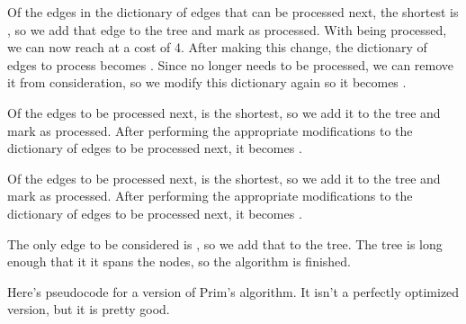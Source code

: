 Of the edges in the dictionary of edges that can be processed next, the shortest is , so we add that edge to the tree and mark  as processed.
With  being processed, we can now reach  at a cost of 4.
After making this change, the dictionary of edges to process becomes .
Since  no longer needs to be processed, we can remove it from consideration, so we modify this dictionary again so it becomes .

Of the edges to be processed next,  is the shortest, so we add it to the tree and mark  as processed.
After performing the appropriate modifications to the dictionary of edges to be processed next, it becomes .

Of the edges to be processed next,  is the shortest, so we add it to the tree and mark  as processed.
After performing the appropriate modifications to the dictionary of edges to be processed next, it becomes .

The only edge to be considered is , so we add that to the tree.
The tree is long enough that it it spans the nodes, so the algorithm is finished.

Here's pseudocode for a version of Prim's algorithm.
It isn't a perfectly optimized version, but it is pretty good.


